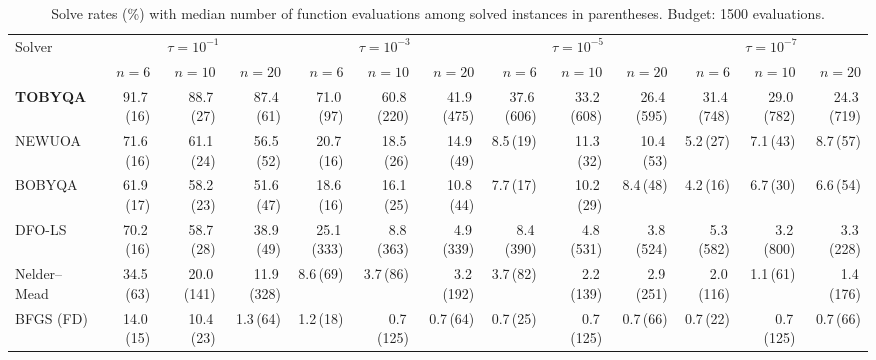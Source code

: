 \begin{table}[t]
\centering\small
\caption{Solve rates (\%) with median number of function evaluations among solved instances in parentheses. Budget: 1500 evaluations.}
\label{tab:solve-rates}
\begin{tabular}{lrrrrrrrrrrrr}
\toprule
Solver & \multicolumn{3}{c}{$\tau=10^{-1}$} & \multicolumn{3}{c}{$\tau=10^{-3}$} & \multicolumn{3}{c}{$\tau=10^{-5}$} & \multicolumn{3}{c}{$\tau=10^{-7}$} \\
\cmidrule(lr){2-4}\cmidrule(lr){5-7}\cmidrule(lr){8-10}\cmidrule(lr){11-13}
 & $n{=}6$ & $n{=}10$ & $n{=}20$ & $n{=}6$ & $n{=}10$ & $n{=}20$ & $n{=}6$ & $n{=}10$ & $n{=}20$ & $n{=}6$ & $n{=}10$ & $n{=}20$ \\
\midrule
\textbf{TOBYQA} & 91.7\,(16) & 88.7\,(27) & 87.4\,(61) & 71.0\,(97) & 60.8\,(220) & 41.9\,(475) & 37.6\,(606) & 33.2\,(608) & 26.4\,(595) & 31.4\,(748) & 29.0\,(782) & 24.3\,(719) \\
NEWUOA & 71.6\,(16) & 61.1\,(24) & 56.5\,(52) & 20.7\,(16) & 18.5\,(26) & 14.9\,(49) & 8.5\,(19) & 11.3\,(32) & 10.4\,(53) & 5.2\,(27) & 7.1\,(43) & 8.7\,(57) \\
BOBYQA & 61.9\,(17) & 58.2\,(23) & 51.6\,(47) & 18.6\,(16) & 16.1\,(25) & 10.8\,(44) & 7.7\,(17) & 10.2\,(29) & 8.4\,(48) & 4.2\,(16) & 6.7\,(30) & 6.6\,(54) \\
DFO-LS & 70.2\,(16) & 58.7\,(28) & 38.9\,(49) & 25.1\,(333) & 8.8\,(363) & 4.9\,(339) & 8.4\,(390) & 4.8\,(531) & 3.8\,(524) & 5.3\,(582) & 3.2\,(800) & 3.3\,(228) \\
Nelder--Mead & 34.5\,(63) & 20.0\,(141) & 11.9\,(328) & 8.6\,(69) & 3.7\,(86) & 3.2\,(192) & 3.7\,(82) & 2.2\,(139) & 2.9\,(251) & 2.0\,(116) & 1.1\,(61) & 1.4\,(176) \\
BFGS (FD) & 14.0\,(15) & 10.4\,(23) & 1.3\,(64) & 1.2\,(18) & 0.7\,(125) & 0.7\,(64) & 0.7\,(25) & 0.7\,(125) & 0.7\,(66) & 0.7\,(22) & 0.7\,(125) & 0.7\,(66) \\
\bottomrule
\end{tabular}
\end{table}
